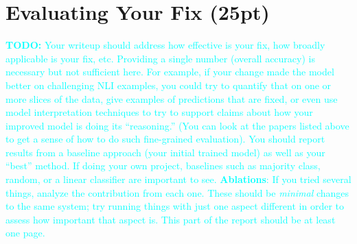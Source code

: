 \documentclass[twocolumn]{article}
\newcommand{\todo}[1]{\textcolor{cyan}{\textbf{TODO:} #1}}
\begin{document}
\section{Evaluating Your Fix (25pt)}


\todo{
Your writeup should address how effective is your fix, how broadly applicable
is your fix, etc. Providing a single number (overall accuracy) is necessary but
not sufficient here. For example, if your change made the model better on
challenging NLI examples, you could try to quantify that on one or more slices
of the data, give examples of predictions that are fixed, or even use model
interpretation techniques to try to support claims about how your improved
model is doing its ``reasoning.'' (You can look at the papers listed above to
get a sense of how to do such fine-grained evaluation).  You should report
results from a baseline approach (your initial trained model) as well as your
``best'' method. If doing your own project, baselines such as majority class,
random, or a linear classifier are important to see. \textbf{Ablations}: If you
tried several things, analyze the contribution from each one. These should be
\emph{minimal} changes to the same system; try running things with just one
aspect different in order to assess how important that aspect is. This part of
the report should be at least one page.}




\end{document}
